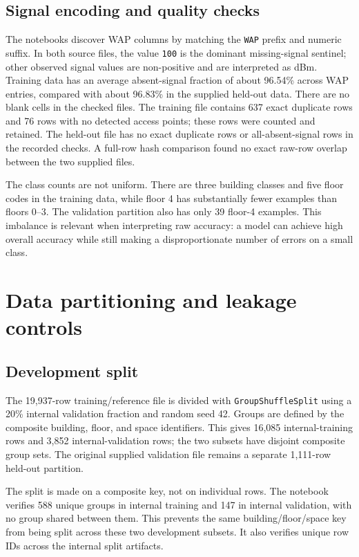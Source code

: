 \documentclass[conference]{IEEEtran}
\begin{document}
\subsection{Signal encoding and quality checks}
The notebooks discover WAP columns by matching the \texttt{WAP} prefix and numeric suffix. In both source files, the value \texttt{100} is the dominant missing-signal sentinel; other observed signal values are non-positive and are interpreted as dBm. Training data has an average absent-signal fraction of about 96.54\% across WAP entries, compared with about 96.83\% in the supplied held-out data. There are no blank cells in the checked files. The training file contains 637 exact duplicate rows and 76 rows with no detected access points; these rows were counted and retained. The held-out file has no exact duplicate rows or all-absent-signal rows in the recorded checks. A full-row hash comparison found no exact raw-row overlap between the two supplied files.

The class counts are not uniform. There are three building classes and five floor codes in the training data, while floor 4 has substantially fewer examples than floors 0--3. The validation partition also has only 39 floor-4 examples. This imbalance is relevant when interpreting raw accuracy: a model can achieve high overall accuracy while still making a disproportionate number of errors on a small class.

\section{Data partitioning and leakage controls}
\subsection{Development split}
The 19,937-row training/reference file is divided with \texttt{GroupShuffleSplit} using a 20\% internal validation fraction and random seed 42. Groups are defined by the composite building, floor, and space identifiers. This gives 16,085 internal-training rows and 3,852 internal-validation rows; the two subsets have disjoint composite group sets. The original supplied validation file remains a separate 1,111-row held-out partition.

The split is made on a composite key, not on individual rows. The notebook verifies 588 unique groups in internal training and 147 in internal validation, with no group shared between them. This prevents the same building/floor/space key from being split across these two development subsets. It also verifies unique row IDs across the internal split artifacts.
\end{document}
